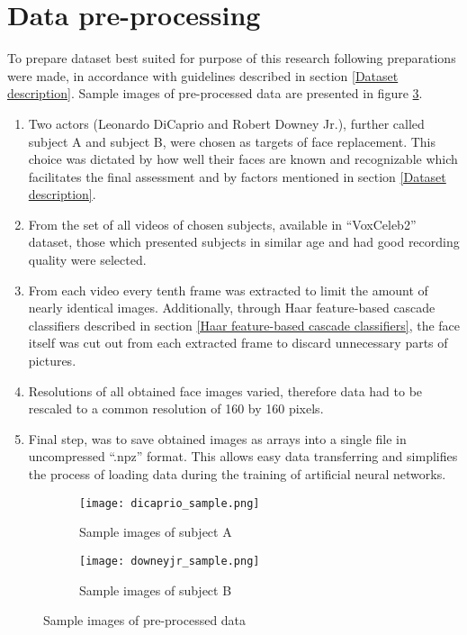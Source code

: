 \section{Data pre-processing}
To prepare dataset best suited for purpose of this research following preparations were made, in accordance with guidelines described in section \ref{Dataset description}. Sample images of pre-processed data are presented in figure \ref{fig:subjects_sample}.

\begin{enumerate}
\item Two actors (Leonardo DiCaprio and Robert Downey Jr.), further called subject A and subject B, were chosen as targets of face replacement. This choice was dictated by how well their faces are known and recognizable which facilitates the final assessment and by factors mentioned in section \ref{Dataset description}.

\item From the set of all videos of chosen subjects, available in ``VoxCeleb2'' dataset, those which presented subjects in similar age and had good recording quality were selected.

\item From each video every tenth frame was extracted to limit the amount of nearly identical images. Additionally, through Haar feature-based cascade classifiers described in section \ref{Haar feature-based cascade classifiers}, the face itself was cut out from each extracted frame to discard unnecessary parts of pictures.

\item Resolutions of all obtained face images varied, therefore data had to be rescaled to a common resolution of 160 by 160 pixels.

\item Final step, was to save obtained images as arrays into a single file in uncompressed ``.npz'' format. This allows easy data transferring and simplifies the process of loading data during the training of artificial neural networks.
\end{enumerate}

\begin{figure}[H]
\centering
\begin{subfigure}{.5\textwidth}
  \centering
  \texttt{[image: dicaprio\_sample.png]}
  \caption{Sample images of subject A}
  \label{subfig:subject_A_sample}
\end{subfigure}%
\begin{subfigure}{.5\textwidth}
  \centering
  \texttt{[image: downeyjr\_sample.png]}
  \caption{Sample images of subject B}
  \label{subfig:subject_B_sample}
\end{subfigure}
\caption{Sample images of pre-processed data}
\label{fig:subjects_sample}
\end{figure}
